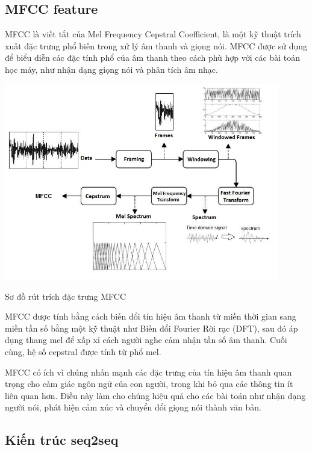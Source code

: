 \subsection{MFCC feature}

MFCC là viết tắt của Mel Frequency Cepstral Coefficient, là một kỹ thuật trích xuất đặc trưng phổ biến trong xử lý âm thanh và giọng nói. MFCC được sử dụng để biểu diễn các đặc tính phổ của âm thanh theo cách phù hợp với các bài toán học máy, như nhận dạng giọng nói và phân tích âm nhạc.

\begin{minipage}{\linewidth}
    \captionsetup{type=figure}
    \centering
    \includegraphics[width=0.9\textwidth]{images/mfcc.png}
    \caption{Sơ đồ rút trích đặc trưng MFCC}
\end{minipage}\par\vfill

MFCC được tính bằng cách biến đổi tín hiệu âm thanh từ miền thời gian sang miền tần số bằng một kỹ thuật như Biến đổi Fourier Rời rạc (DFT), sau đó áp dụng thang mel để xấp xỉ cách người nghe cảm nhận tần số âm thanh. Cuối cùng, hệ số cepstral được tính từ phổ mel.

MFCC có ích vì chúng nhấn mạnh các đặc trưng của tín hiệu âm thanh quan trọng cho cảm giác ngôn ngữ của con người, trong khi bỏ qua các thông tin ít liên quan hơn. Điều này làm cho chúng hiệu quả cho các bài toán như nhận dạng người nói, phát hiện cảm xúc và chuyển đổi giọng nói thành văn bản\cite{mfcc}.

\subsection{Kiến trúc seq2seq}

